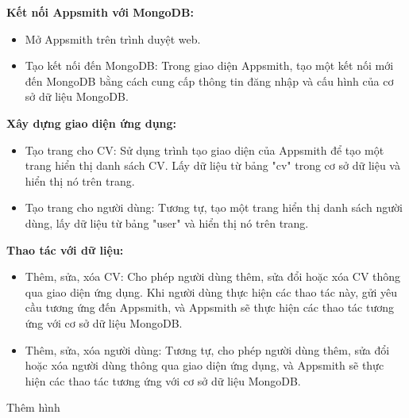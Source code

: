 \textbf{Kết nối Appsmith với MongoDB:}
\begin{itemize}
    \item Mở Appsmith trên trình duyệt web.
    \item Tạo kết nối đến MongoDB: Trong giao diện Appsmith, tạo một kết nối mới đến MongoDB bằng cách cung cấp thông tin đăng nhập và cấu hình của cơ sở dữ liệu MongoDB.
\end{itemize}
\textbf{Xây dựng giao diện ứng dụng:}
\begin{itemize}
    \item Tạo trang cho CV: Sử dụng trình tạo giao diện của Appsmith để tạo một trang hiển thị danh sách CV. Lấy dữ liệu từ bảng "cv" trong cơ sở dữ liệu và hiển thị nó trên trang.
    \item Tạo trang cho người dùng: Tương tự, tạo một trang hiển thị danh sách người dùng, lấy dữ liệu từ bảng "user" và hiển thị nó trên trang.
\end{itemize}
\textbf{Thao tác với dữ liệu:}
\begin{itemize}
    \item Thêm, sửa, xóa CV: Cho phép người dùng thêm, sửa đổi hoặc xóa CV thông qua giao diện ứng dụng. Khi người dùng thực hiện các thao tác này, gửi yêu cầu tương ứng đến Appsmith, và Appsmith sẽ thực hiện các thao tác tương ứng với cơ sở dữ liệu MongoDB.
    \item Thêm, sửa, xóa người dùng: Tương tự, cho phép người dùng thêm, sửa đổi hoặc xóa người dùng thông qua giao diện ứng dụng, và Appsmith sẽ thực hiện các thao tác tương ứng với cơ sở dữ liệu MongoDB.
\end{itemize}

Thêm hình